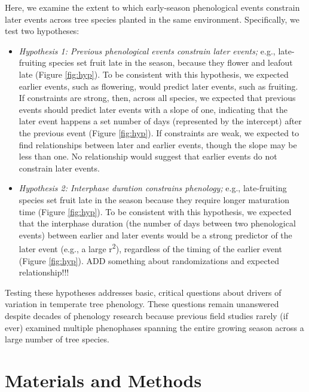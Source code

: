 \documentclass{article}
\begin{document}
\par Here, we examine the extent to which early-season phenological events constrain later events across tree species planted in the same environment. Specifically, we test two hypotheses:
\begin{itemize}
\item \textit{Hypothesis 1: Previous phenological events constrain later events;} e.g., late-fruiting species set fruit late in the season, because they flower and leafout late (Figure \ref{fig:hyp}). To be consistent with this hypothesis, we expected earlier events, such as flowering, would predict later events, such as fruiting. If constraints are strong, then, across all species, we expected that previous events should predict later events with a slope of one, indicating that the later event happens a set number of days (represented by the intercept) after the previous event (Figure \ref{fig:hyp}). If constraints are weak, we expected to find relationships between later and earlier events, though the slope may be less than one. No relationship would suggest that earlier events do not constrain later events.

\item \textit{Hypothesis 2: Interphase duration constrains phenology;} e.g., late-fruiting species set fruit late in the season because they require longer maturation time (Figure \ref{fig:hyp}). To be consistent with this hypothesis, we expected that the interphase duration (the number of days between two phenological events) between earlier and later events would be a strong predictor of the later event (e.g., a large r\textsuperscript{2}), regardless of the timing of the earlier event (Figure \ref{fig:hyp}). ADD something about randomizations and expected relationship!!!
\end{itemize}
Testing these hypotheses addresses basic, critical questions about drivers of variation in temperate tree phenology. These questions remain unanswered despite decades of phenology research because previous field studies rarely (if ever) examined multiple phenophases spanning the entire growing season across a large number of tree species. 
\section* {Materials and Methods}
\end{document}
